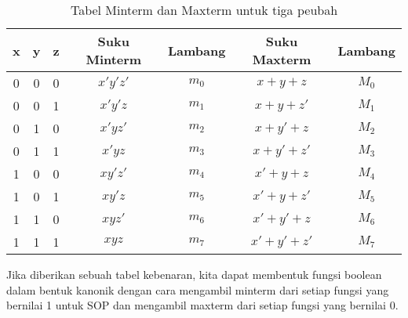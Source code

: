 \documentclass[11pt]{article}
\theoremstyle{definitionstyle}
\theoremstyle{theoremstyle}
\theoremstyle{examplestyle}
\begin{document}
\begin{table}[H]
    \centering
    \begin{tabular}{|c|c|c|c|c|c|c|}
        \hline
        \textbf{x} & \textbf{y} & \textbf{z} & \textbf{Suku Minterm} & \textbf{Lambang} & \textbf{Suku Maxterm} & \textbf{Lambang} \\ \hline
        0          & 0          & 0          & $x'y'z'$              & $m_0$           & $x + y + z$           & $M_0$           \\ \hline
        0          & 0          & 1          & $x'y'z$               & $m_1$           & $x + y + z'$          & $M_1$           \\ \hline
        0          & 1          & 0          & $x'yz'$               & $m_2$           & $x + y' + z$          & $M_2$           \\ \hline
        0          & 1          & 1          & $x'yz$                & $m_3$           & $x + y' + z'$         & $M_3$           \\ \hline
        1          & 0          & 0          & $xy'z'$               & $m_4$           & $x' + y + z$          & $M_4$           \\ \hline
        1          & 0          & 1          & $xy'z$                & $m_5$           & $x' + y + z'$         & $M_5$           \\ \hline
        1          & 1          & 0          & $xyz'$                & $m_6$           & $x' + y' + z$         & $M_6$           \\ \hline
        1          & 1          & 1          & $xyz$                 & $m_7$           & $x' + y' + z'$        & $M_7$           \\ \hline
    \end{tabular}
    \caption{Tabel Minterm dan Maxterm untuk tiga peubah}
\end{table}

Jika diberikan sebuah tabel kebenaran, kita dapat membentuk fungsi boolean dalam bentuk kanonik dengan cara mengambil minterm dari setiap fungsi yang bernilai 1 untuk SOP dan mengambil maxterm dari setiap fungsi yang bernilai 0.
\end{document}
